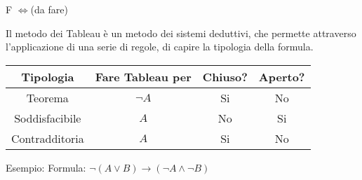 F $\iff$(da fare)

Il metodo dei Tableau è un metodo dei sistemi deduttivi, che permette attraverso
l'applicazione di una serie di regole, di capire la tipologia della formula.

\begin{tabular}{cccc}
\toprule Tipologia & Fare Tableau per & Chiuso? & Aperto? \\
\midrule
         Teorema & $\neg A$ & Si & No \\
         Soddisfacibile & $A$ & No & Si \\
         Contradditoria & $A$ & Si & No \\
\bottomrule
\end{tabular}

Esempio: \newline
Formula: $ \neg(A \lor B) \rightarrow (\neg A \land \neg B)$

